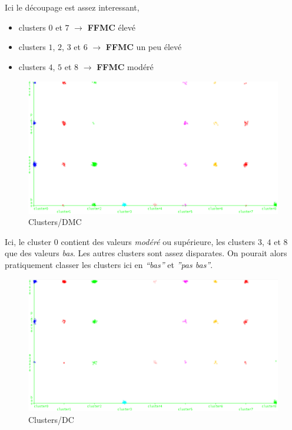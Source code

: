 \documentclass{article}
\begin{document}
\begin{sffamily}
Ici le découpage est assez interessant,
\begin{itemize}
\item clusters $0$ et $7$ $\rightarrow$ \textbf{FFMC} élevé
\item clusters $1$, $2$, $3$ et $6$ $\rightarrow$ \textbf{FFMC} un peu élevé
\item clusters $4$, $5$ et $8$ $\rightarrow$ \textbf{FFMC} modéré
\end{itemize}
\newpage
\begin{figure}[h!]
    \begin{center}
    \includegraphics[width=\textwidth]{img_010.pdf}
    \caption{Clusters/DMC}
    \end{center}	
\end{figure}

Ici, le cluster $0$ contient des valeurs \textit{modéré} ou supérieure, les clusters $3$, $4$ et $8$ que des valeurs \textit{bas}. Les autres 
clusters sont assez disparates. On pourait alors pratiquement classer les clusters ici en \textit{``bas''} et \textit{''pas bas''}.

\begin{figure}[h!]
    \begin{center}
    \includegraphics[width=\textwidth]{img_011.pdf}
    \caption{Clusters/DC}
    \end{center}	
\end{figure}


\end{sffamily}
\end{document}
